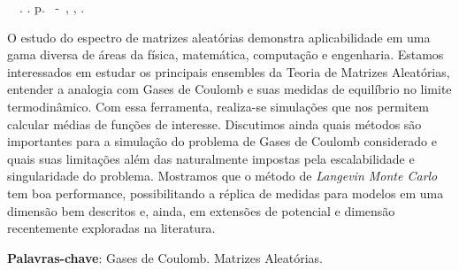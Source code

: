 \setlength{\absparsep}{18pt} %
\begin{resumo}
	\begin{flushleft} 
			\setlength{\absparsep}{0pt} %
			\SingleSpacing 
			\imprimirautorabr~~\textbf{\imprimirtituloresumo}.	\imprimirdata. \pageref{LastPage}p. 
			\imprimirtipotrabalho~-~\imprimirinstituicao, \imprimirlocal, \imprimirdata. 
 	\end{flushleft}
\OnehalfSpacing 	
		
O estudo do espectro de matrizes aleatórias demonstra aplicabilidade em uma gama diversa de áreas da física, matemática, computação e engenharia. Estamos interessados em estudar os principais ensembles da Teoria de Matrizes Aleatórias, entender a analogia com Gases de Coulomb e suas medidas de equilíbrio no limite termodinâmico. Com essa ferramenta, realiza-se simulações que nos permitem calcular médias de funções de interesse. Discutimos ainda quais métodos são importantes para a simulação do problema de Gases de Coulomb  considerado e quais suas limitações além das naturalmente impostas pela escalabilidade e singularidade do problema. Mostramos que o método de \textit{Langevin Monte Carlo} tem boa performance, possibilitando a réplica de medidas para modelos em uma dimensão bem descritos e, ainda, em extensões de potencial e dimensão recentemente exploradas na literatura.

 \textbf{Palavras-chave}: Gases de Coulomb. Matrizes Aleatórias. 
\end{resumo}